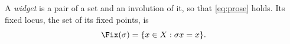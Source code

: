 \begin{definition}[Widget]\label{sy-0001}
A \emph{widget} is a pair of a set and an involution of it, so that \eqref{eq:prose} holds. Its fixed locus, the set of its fixed points, is
\begin{equation}\label{eq:fix}
\Fix(\sigma) = \{x \in X : \sigma x = x\}.
\end{equation}
\end{definition}